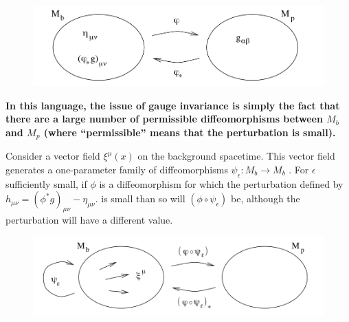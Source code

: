 \begin{enumerate}
\begin{figure}[h!]
	\centering
	\includegraphics[width=0.7\linewidth]{gfx/GaugeInvarianceGR}
	\caption{}
	\label{fig:gaugeinvariancegr}
\end{figure}





\begin{statements}
	\textbf{In this language, the issue of gauge invariance is simply the fact that there are a large
	number of permissible diffeomorphisms between $M_b$ and $M_p$ (where “permissible” means that the perturbation is small).}
\end{statements}
Consider a vector field $\xi^μ (x)$ on the background spacetime.
This vector field generates a one-parameter family of diffeomorphisms $ψ_\epsilon : M_b → M_b$ . For
$\epsilon$ sufficiently small, if $\phi$ is a diffeomorphism for which the perturbation defined by $	h_{\mu \nu} = (\phi^* g)_{\mu \nu} -\eta_{\mu \nu}.$ is
small than so will $(\phi \circ ψ_\epsilon )$ be, although the perturbation will have a different value.
\begin{figure}[h!]
	\centering
	\includegraphics[width=0.7\linewidth]{gfx/GaugeInvarianceGr2}
	\caption{}
	\label{fig:gaugeinvariancegr2}
\end{figure}


\end{enumerate}
